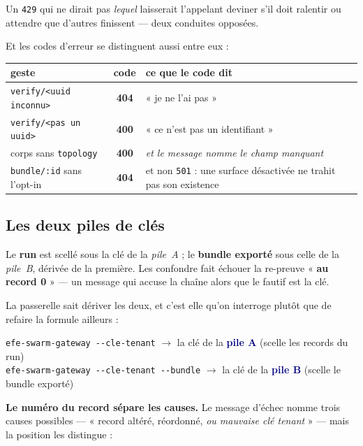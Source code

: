 \documentclass[10pt]{report}
\newcommand{\code}[1]{\texttt{\small #1}}
\newcommand{\mm}[1]{\textbf{\textcolor{navy}{#1}}}
\newcommand{\att}[1]{\textcolor{amber}{\textbf{#1}}}
\begin{document}
Un \code{429} qui ne dirait pas \emph{lequel} laisserait l'appelant deviner s'il doit ralentir ou
attendre que d'autres finissent --- deux conduites opposées.

Et les codes d'erreur se distinguent aussi entre eux :

\begin{longtable}{@{}p{7.0cm} c p{6.4cm}@{}}
\toprule \textbf{geste} & \textbf{code} & \textbf{ce que le code dit} \\ \midrule \endhead
\code{verify/<uuid inconnu>} & \att{404} & « je ne l'ai pas » \\
\code{verify/<pas un uuid>} & \att{400} & « ce n'est pas un identifiant » \\
corps sans \code{topology} & \att{400} & \emph{et le message nomme le champ manquant} \\
\code{bundle/:id} sans l'opt-in & \att{404} & et non \code{501} : une surface désactivée ne trahit pas son existence \\
\bottomrule
\end{longtable}

\subsection{Les deux piles de clés}

\begin{alerte}
Le \textbf{run} est scellé sous la clé de la \emph{pile~A} ; le \textbf{bundle exporté} sous celle
de la \emph{pile~B}, dérivée de la première. Les confondre fait échouer la re-preuve
« \textbf{au record 0} » --- un message qui accuse la chaîne alors que le fautif est la clé.
\end{alerte}

La passerelle sait dériver les deux, et c'est elle qu'on interroge plutôt que de refaire la formule
ailleurs :

\begin{extrait}
\footnotesize
\code{efe-swarm-gateway -{}-cle-tenant} \hfill $\rightarrow$ la clé de la \mm{pile A} (scelle les records du run)\\
\code{efe-swarm-gateway -{}-cle-tenant -{}-bundle} \hfill $\rightarrow$ la clé de la \mm{pile B} (scelle le bundle exporté)
\end{extrait}

\att{Le numéro du record sépare les causes.} Le message d'échec nomme trois causes possibles ---
« record altéré, réordonné, \emph{ou mauvaise clé tenant} » --- mais la position les distingue :
\end{document}
